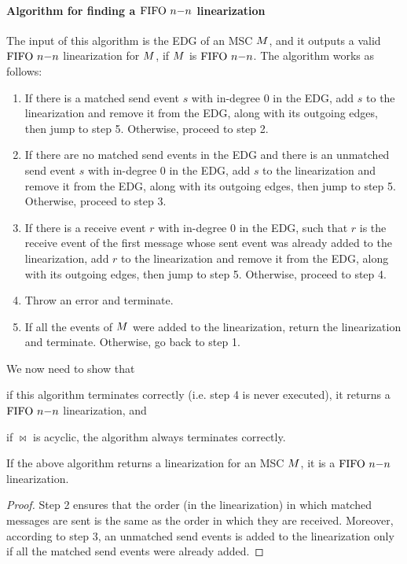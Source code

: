 \paragraph*{Algorithm for finding a $\text{FIFO } n\mathsf{-}n$ linearization}
The input of this algorithm is the EDG of an MSC $M$, and it outputs a valid $\text{FIFO } n\mathsf{-}n$ linearization for $M$, if $M$ is $\text{FIFO } n\mathsf{-}n$. The algorithm works as follows:
\begin{enumerate}
	\item If there is a matched send event $s$ with in-degree 0 in the EDG, add $s$ to the linearization and remove it from the EDG, along with its outgoing edges, then jump to step 5. Otherwise, proceed to step 2.
	\item If there are no matched send events in the EDG and there is an unmatched send event $s$ with in-degree 0 in the EDG, add $s$ to the linearization and remove it from the EDG, along with its outgoing edges, then jump to step 5. Otherwise, proceed to step 3.
		\item If there is a receive event $r$ with in-degree 0 in the EDG, such that $r$ is the receive event of the first message whose sent event was already added to the linearization, add $r$ to the linearization and remove it from the EDG, along with its outgoing edges, then jump to step 5. Otherwise, proceed to step 4.
		\item Throw an error and terminate.
		\item If all the events of $M$ were added to the linearization, return the linearization and terminate. Otherwise, go back to step 1.
\end{enumerate} 

We now need to show that 
\begin{enumerate*}[label={(\roman*)}]
	\item if this algorithm terminates correctly (i.e. step 4 is never executed), it returns a $\text{FIFO } n\mathsf{-}n$ linearization, and 
	\item if $\bowtie$ is acyclic, the algorithm always terminates correctly.
\end{enumerate*}

\begin{proposition}
	If the above algorithm returns a linearization for an MSC $M$, it is a $\text{FIFO } n\mathsf{-}n$ linearization.
\end{proposition}
\begin{proof}
	Step 2 ensures that the order (in the linearization) in which matched messages are sent is the same as the order in which they are received. Moreover, according to step 3, an unmatched send events is added to the linearization only if all the matched send events were already added.
\end{proof}

